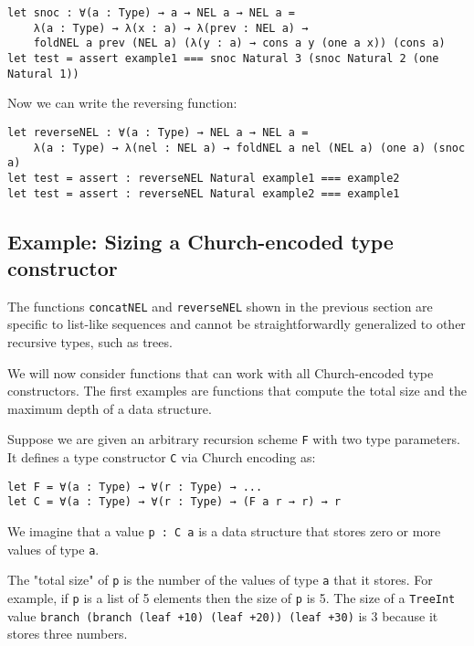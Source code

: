 \begin{lstlisting}[language=Dhall]
let snoc : ∀(a : Type) → a → NEL a → NEL a =
    λ(a : Type) → λ(x : a) → λ(prev : NEL a) →
    foldNEL a prev (NEL a) (λ(y : a) → cons a y (one a x)) (cons a)
let test = assert example1 === snoc Natural 3 (snoc Natural 2 (one Natural 1))
\end{lstlisting}


Now we can write the reversing function:


\begin{lstlisting}[language=Dhall]
let reverseNEL : ∀(a : Type) → NEL a → NEL a =
    λ(a : Type) → λ(nel : NEL a) → foldNEL a nel (NEL a) (one a) (snoc a)
let test = assert : reverseNEL Natural example1 === example2
let test = assert : reverseNEL Natural example2 === example1
\end{lstlisting}


\subsection{Example: Sizing a Church-encoded type constructor}


The functions \lstinline!concatNEL! and \lstinline!reverseNEL! shown in the previous section are specific to list-like sequences and cannot be straightforwardly generalized to other recursive types, such as trees.


We will now consider functions that can work with all Church-encoded type constructors.
The first examples are functions that compute the total size and the maximum depth of a data structure.


Suppose we are given an arbitrary recursion scheme \lstinline!F! with two type parameters. It defines a type constructor \lstinline!C! via Church encoding as:


\begin{lstlisting}[language=Dhall]
let F = ∀(a : Type) → ∀(r : Type) → ...
let C = ∀(a : Type) → ∀(r : Type) → (F a r → r) → r
\end{lstlisting}


We imagine that a value \lstinline!p : C a! is a data structure that stores zero or more values of type \lstinline!a!.


The "total size" of \lstinline!p! is the number of the values of type \lstinline!a! that it stores. For example, if \lstinline!p! is a list of 5 elements then the size of \lstinline!p! is 5. The size
of a \lstinline!TreeInt! value \lstinline!branch (branch (leaf +10) (leaf +20)) (leaf +30)! is 3 because it stores three numbers.


